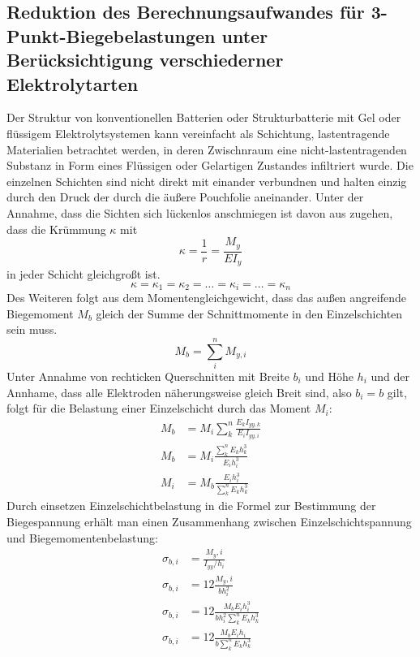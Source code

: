 \subsection*{Reduktion des Berechnungsaufwandes für 3-Punkt-Biegebelastungen unter Berücksichtigung verschiederner Elektrolytarten}

Der Struktur von konventionellen Batterien oder Strukturbatterie mit Gel oder flüssigem Elektrolytsystemen kann vereinfacht als Schichtung, lastentragende Materialien betrachtet werden, in deren Zwischnraum eine nicht-lastentragenden Substanz in Form eines Flüssigen oder Gelartigen Zustandes infiltriert wurde.
Die einzelnen Schichten sind nicht direkt mit einander verbundnen und halten einzig durch den Druck der durch die äußere Pouchfolie aneinander. Unter der Annahme, dass die Sichten sich lückenlos anschmiegen ist davon aus zugehen, dass die Krümmung $\kappa$ mit
\begin{equation}
    \kappa = \frac{1}{r} = \frac{M_y}{E I_y}
\end{equation}
in jeder Schicht gleichgroßt ist.
\begin{equation}
    \kappa = \kappa_1 = \kappa_2 = \dots = \kappa_i = \dots = \kappa_n
\end{equation}
Des Weiteren folgt aus dem Momentengleichgewicht, dass das außen angreifende Biegemoment $M_{b}$ gleich der Summe der Schnittmomente in den Einzelschichten sein muss.
\begin{equation}
    M_{b} = \sum_{i}^{n}M_{y,i}
\end{equation}
Unter Annahme von rechticken Querschnitten mit Breite $b_i$ und Höhe $h_i$ und der Annhame, dass alle Elektroden näherungsweise gleich Breit sind, also $b_i = b$ gilt, folgt für die Belastung einer Einzelschicht durch das Moment $M_i$:
\begin{align}
    M_{b} &= M_i \sum_{k}^{n}\frac{E_k I_{yy,k}}{E_i I_{yy,i}}\\
    M_{b} &= M_i \frac{\sum_{k}^{n} E_k h_k^3}{E_i h_i^3}\\
    M_i &= M_{b} \frac{ E_i h_i^3} { \sum_{k}^{n}E_k h_k^3}
\end{align}
Durch einsetzen Einzelschichtbelastung in die Formel zur Bestimmung der Biegespannung erhält man einen Zusammenhang zwischen Einzelschichtspannung und Biegemomentenbelastung:
\begin{align}
    \sigma_{b,i} &= \frac{M_y,i}{I_{yy}/h_i} \\
    \sigma_{b,i} &= 12 \frac{ M_y,i}{b h_i^2}\\
    \sigma_{b,i} &= 12 \frac{M_{b} E_i h_i^3}{b h_i^2 \sum_{k}^{n}E_k h_k^3}\\
    \sigma_{b,i} &= 12 \frac{M_{b} E_i h_i}{b \sum_{k}^{n}E_k h_k^3}
\end{align}

